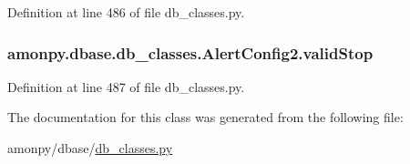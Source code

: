Definition at line 486 of file db\-\_\-classes.\-py.

\hypertarget{classamonpy_1_1dbase_1_1db__classes_1_1_alert_config2_a0338a9f4188da7e5b4e977a6d6a32dff}{
\subsubsection[{valid\-Stop}]{\setlength{\rightskip}{0pt plus 5cm}amonpy.\-dbase.\-db\-\_\-classes.\-Alert\-Config2.\-valid\-Stop}}\label{classamonpy_1_1dbase_1_1db__classes_1_1_alert_config2_a0338a9f4188da7e5b4e977a6d6a32dff}


Definition at line 487 of file db\-\_\-classes.\-py.



The documentation for this class was generated from the following file\-:\begin{DoxyCompactItemize}
\item 
amonpy/dbase/\hyperlink{db__classes_8py}{db\-\_\-classes.\-py}\end{DoxyCompactItemize}
